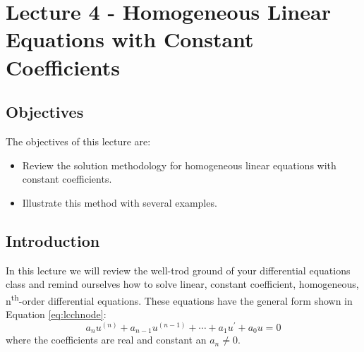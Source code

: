 \chapter{Lecture 4 - Homogeneous Linear Equations with Constant Coefficients}
\label{ch:lec4}
\section{Objectives}
The objectives of this lecture are:
\begin{itemize}
\item Review the solution methodology for homogeneous linear equations with constant coefficients.
\item Illustrate this method with several examples.
\end{itemize}
\section{Introduction} 
In this lecture we will review the well-trod ground of your differential equations class and remind ourselves how to solve linear, constant coefficient, homogeneous, n\textsuperscript{th}-order differential equations.  These equations have the general form shown in Equation \ref{eq:lcchnode}:
\begin{equation}
a_nu^{(n)}+a_{n-1}u^{(n-1)}+\cdots+a_1u^{\prime}+a_0u=0
\label{eq:lcchnode}
\end{equation}
\noindent where the coefficients are real and constant an $a_n \ne 0$.

